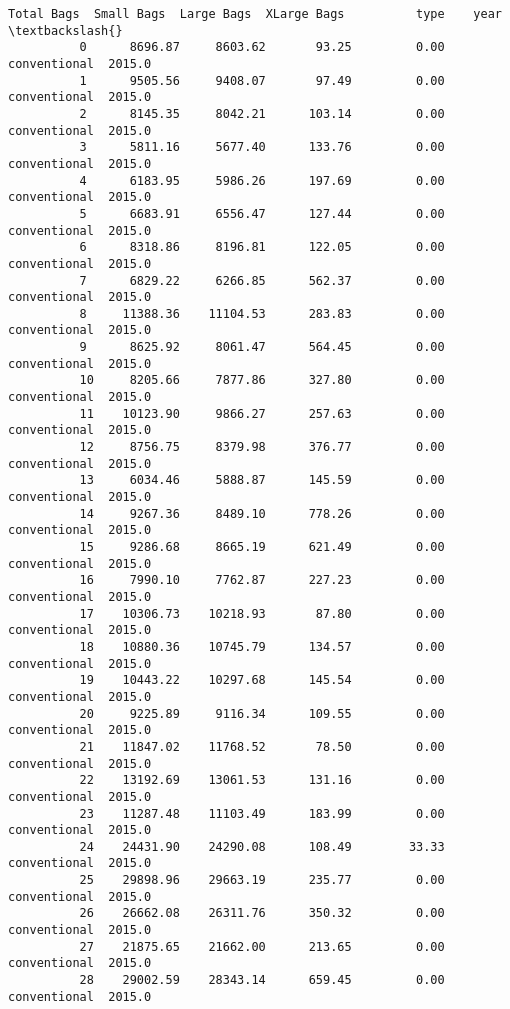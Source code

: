 \documentclass[11pt]{article}
\begin{document}
\begin{Verbatim}[commandchars=\\\{\}]
              Total Bags  Small Bags  Large Bags  XLarge Bags          type    year  \textbackslash{}
          0      8696.87     8603.62       93.25         0.00  conventional  2015.0   
          1      9505.56     9408.07       97.49         0.00  conventional  2015.0   
          2      8145.35     8042.21      103.14         0.00  conventional  2015.0   
          3      5811.16     5677.40      133.76         0.00  conventional  2015.0   
          4      6183.95     5986.26      197.69         0.00  conventional  2015.0   
          5      6683.91     6556.47      127.44         0.00  conventional  2015.0   
          6      8318.86     8196.81      122.05         0.00  conventional  2015.0   
          7      6829.22     6266.85      562.37         0.00  conventional  2015.0   
          8     11388.36    11104.53      283.83         0.00  conventional  2015.0   
          9      8625.92     8061.47      564.45         0.00  conventional  2015.0   
          10     8205.66     7877.86      327.80         0.00  conventional  2015.0   
          11    10123.90     9866.27      257.63         0.00  conventional  2015.0   
          12     8756.75     8379.98      376.77         0.00  conventional  2015.0   
          13     6034.46     5888.87      145.59         0.00  conventional  2015.0   
          14     9267.36     8489.10      778.26         0.00  conventional  2015.0   
          15     9286.68     8665.19      621.49         0.00  conventional  2015.0   
          16     7990.10     7762.87      227.23         0.00  conventional  2015.0   
          17    10306.73    10218.93       87.80         0.00  conventional  2015.0   
          18    10880.36    10745.79      134.57         0.00  conventional  2015.0   
          19    10443.22    10297.68      145.54         0.00  conventional  2015.0   
          20     9225.89     9116.34      109.55         0.00  conventional  2015.0   
          21    11847.02    11768.52       78.50         0.00  conventional  2015.0   
          22    13192.69    13061.53      131.16         0.00  conventional  2015.0   
          23    11287.48    11103.49      183.99         0.00  conventional  2015.0   
          24    24431.90    24290.08      108.49        33.33  conventional  2015.0   
          25    29898.96    29663.19      235.77         0.00  conventional  2015.0   
          26    26662.08    26311.76      350.32         0.00  conventional  2015.0   
          27    21875.65    21662.00      213.65         0.00  conventional  2015.0   
          28    29002.59    28343.14      659.45         0.00  conventional  2015.0   

\end{Verbatim}
\end{document}
